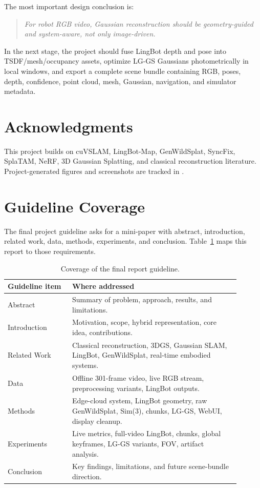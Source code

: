 \documentclass[11pt]{article}
\newcommand{\methodabbr}{LG-GS}
\newcommand{\RouteB}{\methodabbr\xspace}
\begin{document}
The most important design conclusion is:

\begin{quote}
\emph{For robot RGB video, Gaussian reconstruction should be geometry-guided and system-aware, not only image-driven.}
\end{quote}

In the next stage, the project should fuse LingBot depth and pose into TSDF/mesh/occupancy assets, optimize \RouteB Gaussians photometrically in local windows, and export a complete scene bundle containing RGB, poses, depth, confidence, point cloud, mesh, Gaussian, navigation, and simulator metadata.

\section*{Acknowledgments}

This project builds on cuVSLAM, LingBot-Map, GenWildSplat, SyncFix, SplaTAM, NeRF, 3D Gaussian Splatting, and classical reconstruction literature. Project-generated figures and screenshots are tracked in .




\appendix

\section{Guideline Coverage}

The final project guideline asks for a mini-paper with abstract, introduction, related work, data, methods, experiments, and conclusion. Table~\ref{tab:guideline} maps this report to those requirements.

\begin{table}[H]
\centering
\caption{Coverage of the final report guideline.}
\label{tab:guideline}
\begin{tabular}{@{}p{0.25\linewidth}p{0.65\linewidth}@{}}
\toprule
\textbf{Guideline item} & \textbf{Where addressed} \\
\midrule
Abstract & Summary of problem, approach, results, and limitations. \\
Introduction & Motivation, scope, hybrid representation, core idea, contributions. \\
Related Work & Classical reconstruction, 3DGS, Gaussian SLAM, LingBot, GenWildSplat, real-time embodied systems. \\
Data & Offline 301-frame video, live RGB stream, preprocessing variants, LingBot outputs. \\
Methods & Edge-cloud system, LingBot geometry, raw GenWildSplat, Sim(3), chunks, \RouteB, WebUI, display cleanup. \\
Experiments & Live metrics, full-video LingBot, chunks, global keyframes, \RouteB variants, FOV, artifact analysis. \\
Conclusion & Key findings, limitations, and future scene-bundle direction. \\
\bottomrule
\end{tabular}
\end{table}
\end{document}

